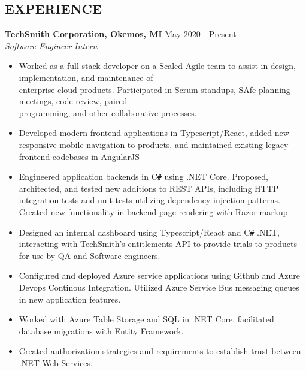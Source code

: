 \documentclass[overlapped]{res}
\begin{document}
\begin{resume}
    \section{EXPERIENCE}
    \textbf{TechSmith Corporation, Okemos, MI}
    \hfill May 2020 - Present \\
    {\sl Software Engineer Intern}
    \begin{itemize}  \itemsep -2pt %
        \item Worked as a full stack developer on a Scaled Agile team to assist in design, implementation, and maintenance of \\
        enterprise cloud products. Participated in Scrum standups, SAfe planning meetings, code review, paired \\
        programming, and other collaborative processes.
        \item Developed modern frontend applications in Typescript/React, added new responsive mobile navigation to products, and maintained existing legacy frontend codebases in AngularJS
        \item Engineered application backends in C\texttt{\#} using .NET Core. Proposed, architected, and tested new additions to REST APIs, 
        including HTTP integration tests and unit tests utilizing dependency injection patterns. 
        Created new functionality in backend page rendering with Razor markup.
        \item Designed an internal dashboard using Typescript/React and C\texttt{\#} .NET, 
        interacting with TechSmith's entitlements API to provide trials to products for use by QA and Software engineers.
        \item Configured and deployed Azure service applications using Github and Azure Devops Continous Integration. Utilized Azure Service Bus messaging queues in new application features.
        \item Worked with Azure Table Storage and SQL in .NET Core, facilitated database migrations with Entity Framework. 
        \item Created authorization strategies and requirements to establish trust between .NET Web Services.
    \end{itemize}


\end{resume}
\end{document}
